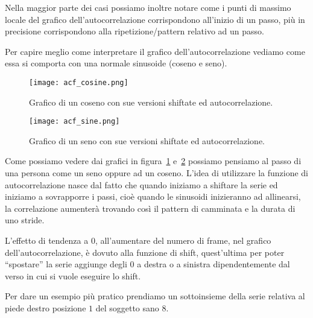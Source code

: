 Nella maggior parte dei casi possiamo inoltre notare come i punti di massimo locale del grafico
dell'autocorrelazione corrispondono all'inizio di un passo, più in precisione corrispondono 
alla ripetizione/pattern relativo ad un passo.

Per capire meglio come interpretare il grafico dell'autocorrelazione vediamo come essa si comporta
con una normale sinusoide (coseno e seno).

\begin{figure}[H]
    \centering
    \texttt{[image: acf\_cosine.png]}
    \caption{Grafico di un coseno con sue versioni shiftate ed autocorrelazione.}
    \label{fig:acf_cosine}
\end{figure}
\begin{figure}[H]
    \centering
    \texttt{[image: acf\_sine.png]}
    \caption{Grafico di un seno con sue versioni shiftate ed autocorrelazione.}
    \label{fig:acf_sine}
\end{figure}

Come possiamo vedere dai grafici in figura~\ref{fig:acf_cosine} e~\ref{fig:acf_sine} 
possiamo pensiamo al passo di una persona come un seno oppure ad un coseno. L'idea di utilizzare la
funzione di autocorrelazione nasce dal fatto che quando iniziamo a shiftare la serie
ed iniziamo a sovrapporre i passi, cioè quando le sinusoidi inizieranno ad allinearsi,
la correlazione aumenterà trovando così il pattern di camminata e la durata di uno stride.

\begin{sloppypar}
L'effetto di tendenza a $0$, all'aumentare del numero di frame, nel grafico dell'autocorrelazione,
è dovuto alla funzione di shift, quest'ultima per poter ``spostare'' la serie aggiunge degli $0$
a destra o a sinistra dipendentemente dal verso in cui si vuole eseguire lo shift.
\end{sloppypar}


Per dare un esempio più pratico prendiamo un sottoinsieme della serie relativa al piede 
destro posizione $1$ del soggetto sano $8$.

